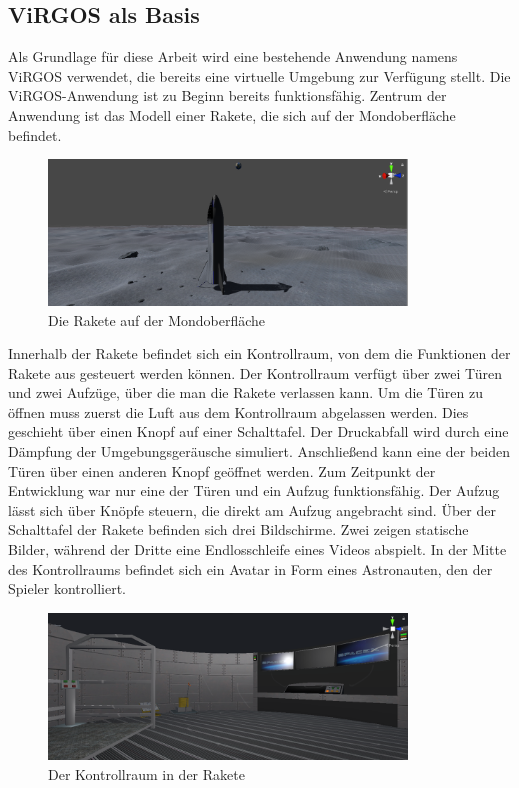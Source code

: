 \subsection{ViRGOS als Basis}
Als Grundlage für diese Arbeit wird eine bestehende Anwendung namens ViRGOS verwendet, die bereits eine virtuelle Umgebung zur Verfügung stellt. Die ViRGOS-Anwendung ist zu Beginn bereits funktionsfähig. Zentrum der Anwendung ist das Modell einer Rakete, die sich auf der Mondoberfläche befindet. \newline

\begin{figure}[H]
\centering
\includegraphics[width=0.85\textwidth]{VirgosRakete.PNG}
\caption{Die Rakete auf der Mondoberfläche}
\end{figure}

Innerhalb der Rakete befindet sich ein Kontrollraum, von dem die Funktionen der Rakete aus gesteuert werden können. Der Kontrollraum verfügt über zwei Türen und zwei Aufzüge, über die man die Rakete verlassen kann. Um die Türen zu öffnen muss zuerst die Luft aus dem Kontrollraum abgelassen werden. Dies geschieht über einen Knopf auf einer Schalttafel. Der Druckabfall wird durch eine Dämpfung der Umgebungsgeräusche simuliert. Anschließend kann eine der beiden Türen über einen anderen Knopf geöffnet werden. Zum Zeitpunkt der Entwicklung war nur eine der Türen und ein Aufzug funktionsfähig. Der Aufzug lässt sich über Knöpfe steuern, die direkt am Aufzug angebracht sind. Über der Schalttafel der Rakete befinden sich drei Bildschirme. Zwei zeigen statische Bilder, während der Dritte eine Endlosschleife eines Videos abspielt. In der Mitte des Kontrollraums befindet sich ein Avatar in Form eines Astronauten, den der Spieler kontrolliert.\newline

\begin{figure}[H]
\centering
\includegraphics[width=0.85\textwidth]{VirgosKommandozentrale.PNG}
\caption{Der Kontrollraum in der Rakete}
\end{figure}

